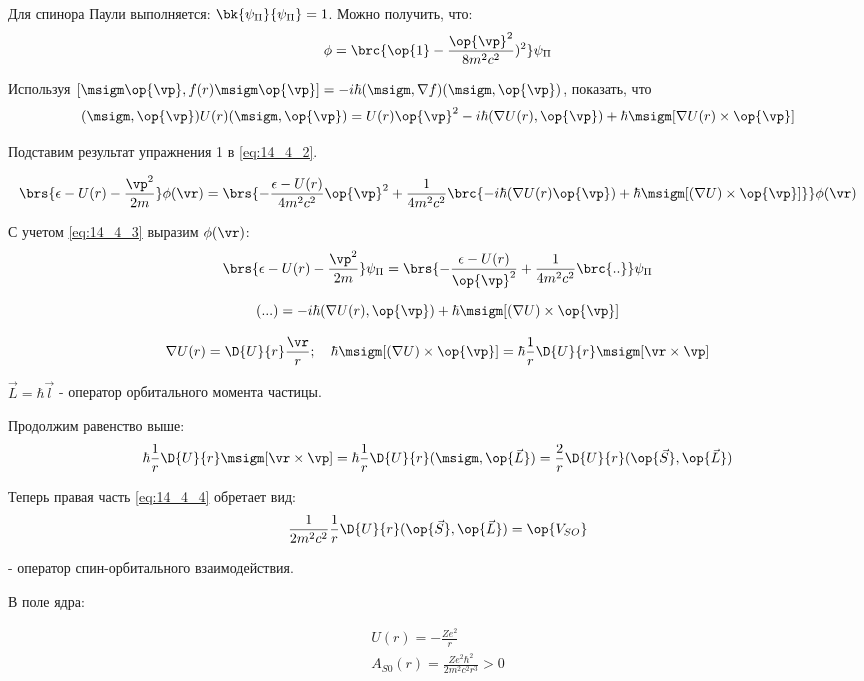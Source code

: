 Для спинора Паули выполняется: $\bk{\psi_\Pi}{\psi_\Pi} = 1$. Можно получить, что:
\begin{equation}
\label{eq:14_4_3}
\phi = \brc{\op{1} - \frac{\op{\vp}^2}{8m^2c^2})^2} \psi_\Pi
\end{equation}

\begin{excr}
Используя $[\msigm \op{\vp}, f(r) \msigm \op{\vp}] = -i\hbar (\msigm, \nabla f)(\msigm, \op{\vp})$, показать, что
$$
(\msigm, \op{\vp}) U(r) (\msigm, \op{\vp}) = U(r) \op{\vp}^2 - i \hbar (\nabla U(r), \op{\vp}) + \hbar \msigm [\nabla U(r) \times \op{\vp}]
$$
\end{excr}

Подставим результат упражнения 1 в \eqref{eq:14_4_2}.

$$
\brs{\epsilon - U(r) - \frac{{\vp}^2}{2m}}\phi(\vr) = \brs{- \frac{\epsilon - U(r)}{4m^2c^2}\op{\vp}^2 + \frac{1}{4m^2 c^2} \brc{-i\hbar (\nabla U(r) \op{\vp}) + \hbar \msigm [(\nabla U) \times \op{\vp}]}} \phi(\vr)
$$

С учетом \eqref{eq:14_4_3} выразим $\phi(\vr)$:
$$
\brs{\epsilon - U(r) - \frac{{\vp}^2}{2m}}\psi_\Pi = \brs{- \frac{\epsilon - U(r)}{\op{\vp}^2} + \frac{1}{4m^2 c^2} \brc{..}} \psi_\Pi
$$

\begin{equation}
\label{eq:14_4_4}
(...) = -i\hbar (\nabla U(r), \op{\vp}) + \hbar \msigm [(\nabla U) \times \op{\vp}]
\end{equation}

$$
\nabla U(r) = \D{U}{r} \frac{\vr}{r};~~~
\hbar \msigm [(\nabla U) \times \op{\vp}] = \hbar \frac{1}{r} \D{U}{r} \msigm [\vr \times \vp] 
$$

$\vec{L} = \hbar \vec{l}$ - оператор орбитального момента частицы.

Продолжим равенство выше:
$$
\hbar \frac{1}{r} \D{U}{r} \msigm [\vr \times \vp] = {\hbar} \frac{1}{r} \D{U}{r} (\msigm, \op{\vec{L}}) = \frac{2}{r} \D{U}{r} (\op{\vec{S}}, \op{\vec{L}})
$$

Теперь правая часть \eqref{eq:14_4_4} обретает вид: 
$$\frac{1}{2m^2c^2}\frac{1}{r} \D{U}{r} (\op{\vec{S}}, \op{\vec{L}}) = \op{V_{SO}}$$

- оператор спин-орбитального взаимодействия.

В поле ядра:

\begin{gather*}
U(r) = -\frac{Ze^2}{r} \\
\boxed{A_{S0} (r) = \frac{Ze^2 \hbar^2}{2m^2 c^2 r^3} > 0}
\end{gather*}

